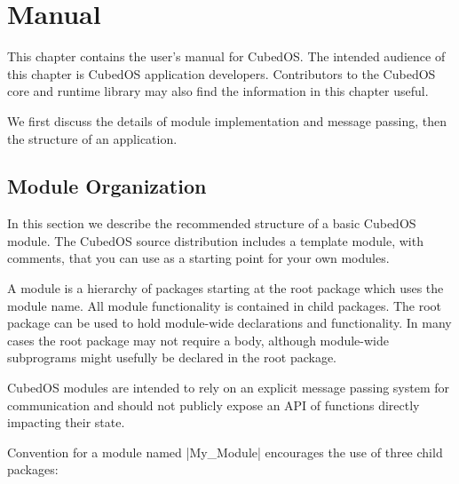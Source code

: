 
\chapter{Manual}
\label{chapt:manual}

This chapter contains the user's manual for CubedOS. The intended audience of this chapter is
CubedOS application developers. Contributors to the CubedOS core and runtime library may also
find the information in this chapter useful.

We first discuss the details of module implementation and message passing, then the structure of
an application.

\section{Module Organization}
\label{sec:module-organization}

In this section we describe the recommended structure of a basic CubedOS module. The CubedOS
source distribution includes a template module, with comments, that you can use as a starting
point for your own modules.

A module is a hierarchy of packages starting at the root package which uses the module name. All
module functionality is contained in child packages. The root package can be used to hold
module-wide declarations and functionality. In many cases the root package may not require a
body, although module-wide subprograms might usefully be declared in the root package.

CubedOS modules are intended to rely on an explicit message passing system for communication and
should not publicly expose an API of functions directly impacting their state.

Convention for a module named |My_Module| encourages the use of three child packages:

